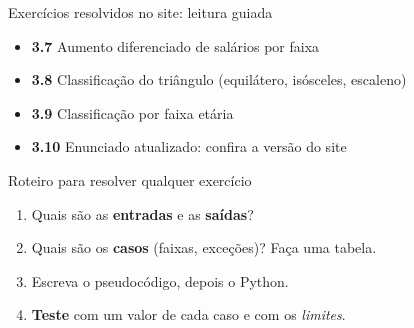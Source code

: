 \documentclass[aspectratio=169,10pt,t]{beamer}
\begin{document}
\begin{frame}{Exercícios resolvidos no site: leitura guiada}
  \begin{itemize}
    \item \textbf{3.7} Aumento diferenciado de salários por faixa
    \item \textbf{3.8} Classificação do triângulo (equilátero, isósceles, escaleno)
    \item \textbf{3.9} Classificação por faixa etária
    \item \textbf{3.10} Enunciado atualizado: confira a versão do site
  \end{itemize}
  \begin{block}{Roteiro para resolver qualquer exercício}
    \begin{enumerate}\small
      \item Quais são as \textbf{entradas} e as \textbf{saídas}?
      \item Quais são os \textbf{casos} (faixas, exceções)? Faça uma tabela.
      \item Escreva o pseudocódigo, depois o Python.
      \item \textbf{Teste} com um valor de cada caso e com os \emph{limites}.
    \end{enumerate}
  \end{block}
\end{frame}


\end{document}
